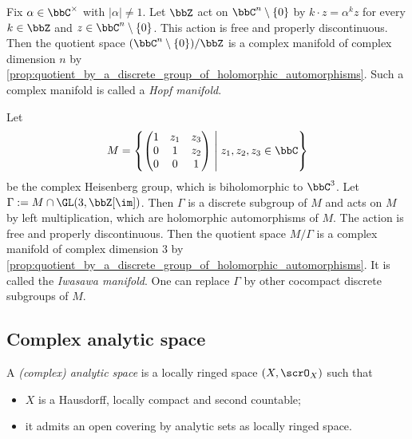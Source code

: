 \begin{example}\label{eg:hopf_manifolds_as_complex_manifolds_by_quotient_of_Cn}
	Fix \(\alpha \in \bbC^\times\) with \(|\alpha| \neq 1\).
	Let \(\bbZ\) act on \(\bbC^n\setminus \{0\}\) by \(k \cdot z = \alpha^k z\) for every \(k\in \bbZ\) and \(z\in \bbC^n\setminus \{0\}\).
	This action is free and properly discontinuous.
	Then the quotient space \((\bbC^n\setminus \{0\})/\bbZ\) is a complex manifold of complex dimension \(n\) by \cref{prop:quotient_by_a_discrete_group_of_holomorphic_automorphisms}.
	Such a complex manifold is called a \emph{Hopf manifold}.
\end{example}

\begin{example}\label{eg:Iwasawa_manifold_as_complex_manifold_by_quotient_of_complex_Heisenberg_group}
	Let
	\[ M = \left\{ \begin{pmatrix}
			1 & z_1 & z_3 \\
			0 & 1   & z_2 \\
			0 & 0   & 1
		\end{pmatrix} \;\middle|\; z_1, z_2, z_3 \in \bbC \right\} \]
	be the complex Heisenberg group, which is biholomorphic to \(\bbC^3\).
	Let \(\Gamma := M \cap \GL(3,\bbZ[\im])\).
	Then \(\Gamma\) is a discrete subgroup of \(M\) and acts on \(M\) by left multiplication, which are holomorphic automorphisms of \(M\).
	The action is free and properly discontinuous.
	Then the quotient space \(M/\Gamma\) is a complex manifold of complex dimension \(3\) by \cref{prop:quotient_by_a_discrete_group_of_holomorphic_automorphisms}.
	It is called the \emph{Iwasawa manifold}.
	One can replace \(\Gamma\) by other cocompact discrete subgroups of \(M\).
\end{example}


\subsection{Complex analytic space}

\begin{definition}\label{def:complex-analytic-space}
	A \emph{(complex) analytic space} is a locally ringed space $(X, \scrO_X)$ such that
	\begin{itemize}
		\item $X$ is a Hausdorff, locally compact and second countable;
		\item it admits an open covering by analytic sets as locally ringed space.
	\end{itemize}
\end{definition}

